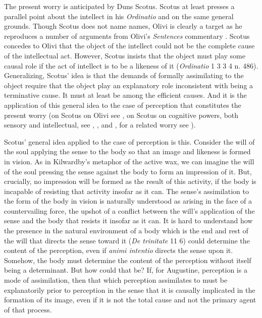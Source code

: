 \documentclass[12pt]{article}
\begin{document}
The present worry is anticipated by Duns Scotus. Scotus at least presses a parallel point about the intellect in his \emph{Ordinatio} and on the same general grounds. Though Scotus does not name names, Olivi is clearly a target as he reproduces a number of arguments from Olivi's \emph{Sentences} commentary \citep[148]{Pasnau:1997aa}. Scotus concedes to Olivi that the object of the intellect could not be the complete cause of the intellectual act. However, Scotus insists that the object must play some causal role if the act of intellect is to be a likeness of it (\emph{Ordinatio} 1 3 3 4 n. 486). Generalizing, Scotus' idea is that the demands of formally assimilating to the object require that the object play an explanatory role inconsistent with being a terminative cause. It must at least be among the efficient causes. And it is the application of this general idea to the case of perception that constitutes the present worry (on Scotus on Olivi see \citealt[chapter 4.4]{Pasnau:1997aa}, on Scotus on cognitive powers, both sensory and intellectual, see \citealt[chapter 3]{Tachau:1988aa}, \citealt[257--266]{Spruit:1994qq}, and \citealt{Cross:2014aa}, for a related worry see \citealt[174--175]{Pasnau:1997aa}). 

Scotus' general idea applied to the case of perception is this. Consider the will of the soul applying the sense to the body so that an image and likeness is formed in vision. As in Kilwardby's metaphor of the active wax, we can imagine the will of the soul pressing the sense against the body to form an impression of it. But, crucially, no impression will be formed as the result of this activity, if the body is incapable of resisting that activity insofar as it can. The sense's assimilation to the form of the body in vision is naturally understood as arising in the face of a countervailing force, the upshot of a conflict between the will's application of the sense and the body that resists it insofar as it can. It is hard to understand how the presence in the natural environment of a body which is the end and rest of the will that directs the sense toward it (\emph{De trinitate} 11 6) could determine the content of the perception, even if \emph{animi intentio} directs the sense upon it. Somehow, the body must determine the content of the perception without itself being a determinant. But how could that be? If, for Augustine, perception is a mode of assimilation, then that which perception assimilates to must be explanatorily prior to perception in the sense that it is causally implicated in the formation of its image, even if it is not the total cause and not the primary agent of that process.
\end{document}
